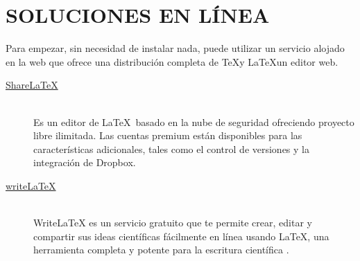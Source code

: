	\section{SOLUCIONES EN LÍNEA}
		Para empezar, sin necesidad de instalar nada, puede utilizar un servicio alojado en la web que ofrece una distribución completa de \TeX y \LaTeX un editor web.
		
		\begin{description}
			\item[\href{https://www.sharelatex.com/}{ShareLaTeX}]  \hfill \\
			Es un editor de \LaTeX\ basado en la nube de seguridad ofreciendo proyecto libre ilimitada. Las cuentas premium están disponibles para las características adicionales, tales como el control de versiones y la integración de Dropbox.
			\item[\href{https://www.sharelatex.com/}{writeLaTeX}]  \hfill \\
			WriteLaTeX es un servicio gratuito que te permite crear, editar y compartir sus ideas científicas fácilmente en línea usando \LaTeX , una herramienta completa y potente para la escritura científica .
		\end{description}
		
		
		
		
		
		
		